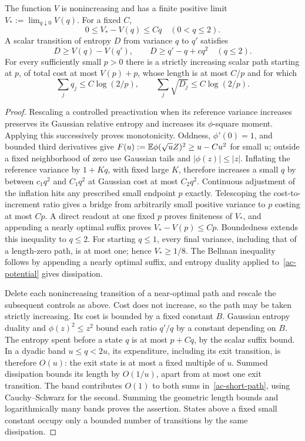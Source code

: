 \begin{lemma}\label{ac-scalar}
The function $V$ is nonincreasing and has a finite positive limit
$V_*:=\lim_{q\downarrow0}V(q)$. For a fixed $C$,
\[
 0\le V_*-V(q)\le Cq\quad(0<q\le2).
\]
A scalar transition of entropy $D$ from variance $q$ to $q'$ satisfies
\[
 D\ge V(q)-V(q'),\qquad D\ge q'-q+cq^2\quad(q\le2).
\]
For every sufficiently small $p>0$ there is a strictly increasing
scalar path starting at $p$, of total cost at most $V(p)+p$, whose
length is at most $C/p$ and for which
\begin{equation}\label{ac-short-path}
 \sum_j q_j\le C\log(2/p),\qquad
 \sum_j\sqrt{D_j}\le C\log(2/p).
\end{equation}
\end{lemma}
\begin{proof}
Rescaling a controlled preactivation when its reference variance
increases preserves its Gaussian relative entropy and increases its
$\phi$-square moment. Applying this successively proves monotonicity.
Oddness, $\phi'(0)=1$, and bounded third derivatives give
$F(u):=\mathbb E\phi(\sqrt uZ)^2\ge u-Cu^2$ for small $u$; outside a
fixed neighborhood of zero use Gaussian tails and $|\phi(z)|\le|z|$.
Inflating the reference variance by $1+Kq$, with fixed large $K$,
therefore increases a small $q$ by between $c_1q^2$ and $C_1q^2$
at Gaussian cost at most $C_2q^2$. Continuous adjustment of the
inflation hits any prescribed small endpoint $p$ exactly. Telescoping
the cost-to-increment ratio gives a bridge from arbitrarily small
positive variance to $p$ costing at most $Cp$. A direct readout at
one fixed $p$ proves finiteness of $V_*$, and appending a nearly
optimal suffix proves $V_*-V(p)\le Cp$. Boundedness extends this
inequality to $q\le2$. For starting $q\le1$, every final variance,
including that of a length-zero path, is at most one; hence $V_*\ge1/8$.
The Bellman inequality follows by appending a nearly optimal suffix,
and entropy duality applied to~\eqref{ac-potential} gives dissipation.

Delete each nonincreasing transition of a near-optimal path and rescale
the subsequent controls as above. Cost does not increase, so the path
may be taken strictly increasing. Its cost is bounded by a fixed
constant $B$. Gaussian entropy duality and $\phi(z)^2\le z^2$ bound
each ratio $q'/q$ by a constant depending on $B$. The entropy spent
before a state $q$ is at most $p+Cq$, by the scalar suffix bound.
In a dyadic band $u\le q<2u$, its expenditure, including its exit
transition, is therefore $O(u)$: the exit state is at most a fixed
multiple of $u$. Summed dissipation bounds its length by $O(1/u)$,
apart from at most one exit transition. The band contributes $O(1)$
to both sums in~\eqref{ac-short-path}, using Cauchy--Schwarz for the
second. Summing the geometric length bounds and logarithmically
many bands proves the assertion. States above a fixed small constant
occupy only a bounded number of transitions by the same dissipation.
\end{proof}

